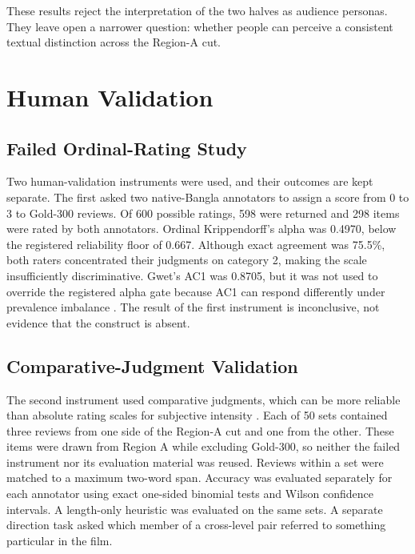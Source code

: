 These results reject the interpretation of the two halves as audience personas. They leave open a narrower question: whether people can perceive a consistent textual distinction across the Region-A cut.

\section{Human Validation}
\label{sec:ch3-human-validation}

\subsection{Failed Ordinal-Rating Study}
\label{sec:ch3-human-validation-ordinal}

Two human-validation instruments were used, and their outcomes are kept separate. The first asked two native-Bangla annotators to assign a score from 0 to 3 to Gold-300 reviews. Of 600 possible ratings, 598 were returned and 298 items were rated by both annotators. Ordinal Krippendorff's alpha \cite{b31} was 0.4970, below the registered reliability floor of 0.667. Although exact agreement was 75.5\%, both raters concentrated their judgments on category 2, making the scale insufficiently discriminative. Gwet's AC1 was 0.8705, but it was not used to override the registered alpha gate because AC1 can respond differently under prevalence imbalance \cite{b44,b45}. The result of the first instrument is inconclusive, not evidence that the construct is absent.

\subsection{Comparative-Judgment Validation}
\label{sec:ch3-human-validation-comparative}

The second instrument used comparative judgments, which can be more reliable than absolute rating scales for subjective intensity \cite{b29}. Each of 50 sets contained three reviews from one side of the Region-A cut and one from the other. These items were drawn from Region A while excluding Gold-300, so neither the failed instrument nor its evaluation material was reused. Reviews within a set were matched to a maximum two-word span. Accuracy was evaluated separately for each annotator using exact one-sided binomial tests and Wilson confidence intervals. A length-only heuristic was evaluated on the same sets. A separate direction task asked which member of a cross-level pair referred to something particular in the film.

